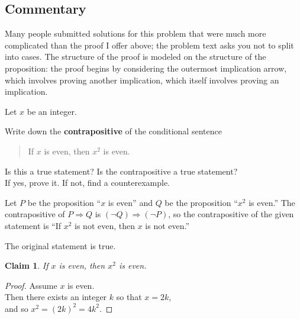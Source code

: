 \documentclass[12pt]{midterm}
\newtheorem*{claim}{Claim}
\begin{document}
\begin{exam}
\begin{solution}
\begin{solutiontext}
\subsection*{Commentary}

Many people submitted solutions for this problem that were much more
complicated than the proof I offer above; the problem text asks you
not to split into cases.  The structure of the proof is modeled on the
structure of the proposition: the proof begins by considering the
outermost implication arrow, which involves proving another
implication, which itself involves proving an implication.

\end{solutiontext}\end{solution}

\begin{problem}[360]
  Let $x$ be an integer. %

  \vspace{1ex}

  \noindent Write down the \textbf{contrapositive} of the conditional sentence
  \begin{quote}
    If $x$ is even, then $x^2$ is even.
  \end{quote}
  Is this a true statement?  Is the contrapositive a true statement? \\
  If yes, prove it.  If not, find a counterexample.
\end{problem}

\begin{solution}\begin{solutiontext}
    Let $P$ be the proposition ``$x$ is even'' and $Q$ be the
    proposition ``$x^2$ is even.''  The contrapositive of $P
    \Rightarrow Q$ is $(\neg Q) \Rightarrow (\neg P)$, so the
    contrapositive of the given statement is ``If $x^2$ is not even, then $x$ is not even.''

    \vspace{1ex}\noindent%
    The original statement is true.
    \begin{claim}
      If $x$ is even, then $x^2$ is even.
    \end{claim}
    \begin{proof}
      Assume $x$ is even. \\
      Then there exists an integer $k$ so that $x = 2k$, \\
      and so $x^2 = (2k)^2 = 4k^2$.


\end{proof}
\end{solutiontext}
\end{solution}
\end{exam}
\end{document}
